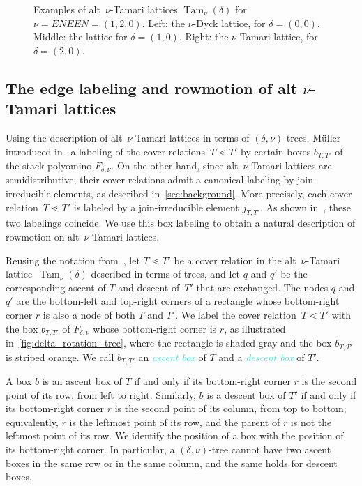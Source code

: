 \documentclass[11pt]{amsart}
\newcommand{\altTam}[2]{\operatorname{Tam}_{#1}(#2)}
\newcommand{\dfn}[1]{\textcolor{Turquoise}{\emph{#1}}}
\theoremstyle{definition}
\begin{document}
\begin{figure}[htb]
\begin{center}

\end{center}
\caption{Examples of alt~$\nu$-Tamari lattices $\altTam{\nu}{\delta}$ for $\nu=ENEEN=(1,2,0)$. Left: the $\nu$-Dyck lattice, for $\delta=(0,0)$. Middle: the lattice for $\delta=(1,0)$. Right: the $\nu$-Tamari lattice, for $\delta=(2,0)$.}
\label{fig:altnu_lattices_ENEEN_trees}
\end{figure}

\subsection{The edge labeling and rowmotion of alt \texorpdfstring{$\nu$}{nu}-Tamari lattices}

Using the description of alt~$\nu$-Tamari lattices in terms of $(\delta,\nu)$-trees, M\"{u}ller introduced in~\cite{mueller2026combinatorial} a labeling of the cover relations~$T\lessdot T'$ by certain boxes $b_{T,T'}$ of the stack polyomino $F_{\delta,\nu}$. On the other hand, since alt~$\nu$-Tamari lattices are semidistributive, their cover relations admit a canonical labeling by join-irreducible elements, as described in~\cref{sec:background}. More precisely, each cover relation~$T\lessdot T'$ is labeled by a join-irreducible element $j_{T,T'}$. As shown in~\cite{mueller2026combinatorial}, these two labelings coincide. We use this box labeling to obtain a natural description of rowmotion on alt~$\nu$-Tamari lattices.

Reusing the notation from~, let $T \lessdot T'$ be a cover relation in the alt~$\nu$-Tamari lattice~$\altTam{\nu}{\delta}$ described in terms of trees, and let $q$ and $q'$ be the corresponding ascent of $T$ and descent of~$T'$ that are exchanged. The nodes $q$ and $q'$ are the bottom-left and top-right corners of a rectangle whose bottom-right corner $r$ is also a node of both $T$ and $T'$. We label the cover relation~$T \lessdot T'$ with the box $b_{T,T'}$ of $F_{\delta,\nu}$ whose bottom-right corner is $r$, as illustrated in~\cref{fig:delta_rotation_tree}, where the rectangle is shaded gray and the box $b_{T,T'}$ is striped orange. We call $b_{T,T'}$ an \dfn{ascent box} of $T$ and a \dfn{descent box} of $T'$.

A box $b$ is an ascent box of $T$ if and only if its bottom-right corner $r$ is the second point of its row, from left to right. Similarly, $b$ is a descent box of $T'$ if and only if its bottom-right corner $r$ is the second point of its column, from top to bottom; equivalently, $r$ is the leftmost point of its row, and the parent of $r$ is not the leftmost point of its row. We identify the position of a box with the position of its bottom-right corner. In particular, a $(\delta,\nu)$-tree cannot have two ascent boxes in the same row or in the same column, and the same holds for descent boxes.
\end{document}
